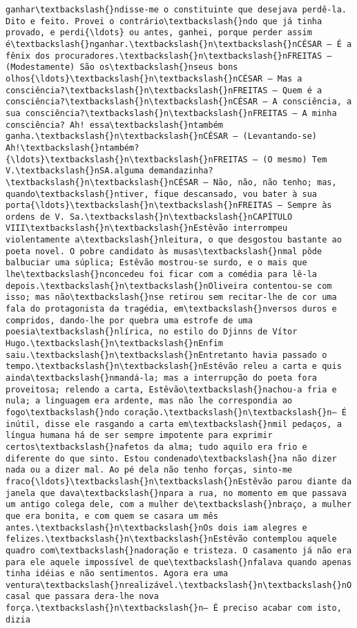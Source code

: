 \documentclass[11pt]{article}
\begin{document}
\begin{Verbatim}[commandchars=\\\{\}]
ganhar\textbackslash{}ndisse-me o constituinte que desejava perdê-la. Dito e feito. Provei o contrário\textbackslash{}ndo que já tinha provado, e perdi{\ldots} ou antes, ganhei, porque perder assim é\textbackslash{}nganhar.\textbackslash{}n\textbackslash{}nCÉSAR — É a fênix dos procuradores.\textbackslash{}n\textbackslash{}nFREITAS — (Modestamente) São os\textbackslash{}nseus bons olhos{\ldots}\textbackslash{}n\textbackslash{}nCÉSAR — Mas a consciência?\textbackslash{}n\textbackslash{}nFREITAS — Quem é a consciência?\textbackslash{}n\textbackslash{}nCÉSAR — A consciência, a sua consciência?\textbackslash{}n\textbackslash{}nFREITAS — A minha consciência? Ah! essa\textbackslash{}ntambém ganha.\textbackslash{}n\textbackslash{}nCÉSAR — (Levantando-se) Ah!\textbackslash{}ntambém?{\ldots}\textbackslash{}n\textbackslash{}nFREITAS — (O mesmo) Tem V.\textbackslash{}nSA.alguma demandazinha?\textbackslash{}n\textbackslash{}nCÉSAR — Não, não, não tenho; mas, quando\textbackslash{}ntiver, fique descansado, vou bater à sua porta{\ldots}\textbackslash{}n\textbackslash{}nFREITAS — Sempre às ordens de V. Sa.\textbackslash{}n\textbackslash{}nCAPÍTULO VIII\textbackslash{}n\textbackslash{}nEstêvão interrompeu violentamente a\textbackslash{}nleitura, o que desgostou bastante ao poeta novel. O pobre candidato às musas\textbackslash{}nmal pôde balbuciar uma súplica; Estêvão mostrou-se surdo, e o mais que lhe\textbackslash{}nconcedeu foi ficar com a comédia para lê-la depois.\textbackslash{}n\textbackslash{}nOliveira contentou-se com isso; mas não\textbackslash{}nse retirou sem recitar-lhe de cor uma fala do protagonista da tragédia, em\textbackslash{}nversos duros e compridos, dando-lhe por quebra uma estrofe de uma poesia\textbackslash{}nlírica, no estilo do Djinns de Vítor Hugo.\textbackslash{}n\textbackslash{}nEnfim saiu.\textbackslash{}n\textbackslash{}nEntretanto havia passado o tempo.\textbackslash{}n\textbackslash{}nEstêvão releu a carta e quis ainda\textbackslash{}nmandá-la; mas a interrupção do poeta fora proveitosa; relendo a carta, Estêvão\textbackslash{}nachou-a fria e nula; a linguagem era ardente, mas não lhe correspondia ao fogo\textbackslash{}ndo coração.\textbackslash{}n\textbackslash{}n— É inútil, disse ele rasgando a carta em\textbackslash{}nmil pedaços, a língua humana há de ser sempre impotente para exprimir certos\textbackslash{}nafetos da alma; tudo aquilo era frio e diferente do que sinto. Estou condenado\textbackslash{}na não dizer nada ou a dizer mal. Ao pé dela não tenho forças, sinto-me fraco{\ldots}\textbackslash{}n\textbackslash{}nEstêvão parou diante da janela que dava\textbackslash{}npara a rua, no momento em que passava um antigo colega dele, com a mulher de\textbackslash{}nbraço, a mulher que era bonita, e com quem se casara um mês antes.\textbackslash{}n\textbackslash{}nOs dois iam alegres e felizes.\textbackslash{}n\textbackslash{}nEstêvão contemplou aquele quadro com\textbackslash{}nadoração e tristeza. O casamento já não era para ele aquele impossível de que\textbackslash{}nfalava quando apenas tinha idéias e não sentimentos. Agora era uma ventura\textbackslash{}nrealizável.\textbackslash{}n\textbackslash{}nO casal que passara dera-lhe nova força.\textbackslash{}n\textbackslash{}n— É preciso acabar com isto, dizia 
\end{Verbatim}
\end{document}

